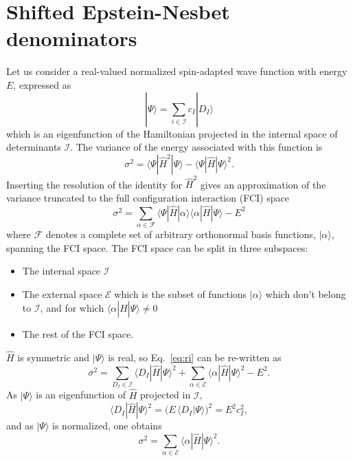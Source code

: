\documentclass[aip,jcp,reprint,showkeys]{revtex4-1}
\newcommand{\ket}[1]{|#1\rangle}
\newcommand{\mel}[3]{\langle #1 | #2 | #3 \rangle}
\begin{document}
\section{Shifted Epstein-Nesbet denominators}


Let us consider a real-valued normalized spin-adapted wave function with
energy $E$, expressed as
\begin{equation}
\ket{\Psi} = \sum_{i \in \mathcal{I}} c_I \ket{D_I}
\end{equation}
which is an eigenfunction of the Hamiltonian projected in the internal space of
determinants $\mathcal{I}$.
The variance of the energy associated with this function is
\begin{equation}
\sigma^2 = \mel{\Psi}{\hat{H}^2}{\Psi} - \mel{\Psi}{\hat{H}}{\Psi}^2 .
\end{equation}
Inserting the resolution of the identity for $\hat{H}^2$ gives an
approximation of the variance truncated to the full configuration interaction (FCI) space
\begin{equation}
\sigma^2 = \sum_{\alpha \in \mathcal{F}} \mel{\Psi}{\hat{H}}{\alpha} \mel{\alpha}{\hat{H}}{\Psi} - E^2
\label{eq:ri}
\end{equation}
where $\mathcal{F}$ denotes a complete set of arbitrary orthonormal basis
functions, $\ket{\alpha}$, spanning the FCI space.
The FCI space can be split in three subspaces:
\begin{itemize}
\item The internal space $\mathcal{I}$
\item The external space $\mathcal{E}$ which is the subset of functions
      $\ket{\alpha}$ which don't belong to $\mathcal{I}$, and for which
      $\mel{\alpha}{\hat{H}}{\Psi} \ne 0$
\item The rest of the FCI space.
\end{itemize}
$\hat{H}$ is symmetric and $\ket{\Psi}$ is real, so Eq.~\eqref{eq:ri} can be
re-written as
\begin{equation}
\sigma^2 = \sum_{D_I    \in \mathcal{I}} \mel{D_I}{\hat{H}}{\Psi}^2 
         + \sum_{\alpha \in \mathcal{E}} \mel{\alpha}{\hat{H}}{\Psi}^2 - E^2.
\end{equation}
As $\ket{\Psi}$ is an eigenfunction of $\hat{H}$ projected in $\mathcal{I}$, 
\begin{equation}
\mel{D_I}{\hat{H}}{\Psi}^2 = \big( E\, \langle D_I | \Psi \rangle \big)^2 = E^2 c_I^2,
\end{equation}
and as $\ket{\Psi}$ is normalized, one obtains
\begin{equation}
\sigma^2 = \sum_{\alpha \in \mathcal{E}} \mel{\alpha}{\hat{H}}{\Psi}^2.
\end{equation} 
\end{document}
